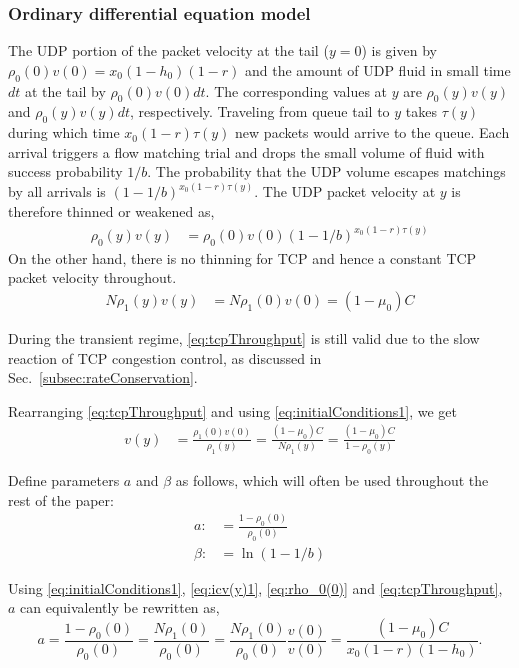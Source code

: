 \documentclass{IEEEtran}
\begin{document}
       \subsubsection{Ordinary differential equation model}\label{subsec:ode}
The UDP portion of the packet velocity at the tail ($y=0$) is given by $\rho_0(0)v(0)=x_0(1-h_0)(1-r)$ and the amount of UDP fluid in small time $dt$ at the tail by $\rho_0(0)v(0)dt$. The corresponding values at $y$ are $\rho_0(y)v(y)$ and $\rho_0(y)v(y)dt$, respectively. Traveling from queue tail to $y$ takes $\tau(y)$ during which time $x_0(1-r)\tau(y)$ new packets would arrive to the queue. Each arrival triggers a flow matching trial and drops the small volume of fluid with success probability $1/b$. The probability that the UDP volume escapes matchings by all arrivals  is $(1-1/b)^{x_0(1-r)\tau(y)}$. The UDP packet velocity at $y$ is therefore thinned or weakened as,
    \begin{align}
        \rho_0(y)v(y)&=\rho_0(0)v(0)(1-1/b)^{x_0(1-r)\tau(y)} \label{eq:chokeSteadyThinning}
    \end{align}
    On the other hand, there is no thinning for TCP and hence a constant  TCP packet velocity throughout. \begin{align}
            N\rho_1(y)v(y)&= N\rho_1(0)v(0)=(1-\mu_0)C     \label{eq:tcpThroughput}
    \end{align}

    During the transient regime, \eqref{eq:tcpThroughput} is still valid due to the slow reaction of TCP congestion control, as discussed in Sec.~\ref{subsec:rateConservation}.

    Rearranging \eqref{eq:tcpThroughput} and using \eqref{eq:initialConditions1}, we get
    \begin{align}
            v(y)&= \frac{\rho_1(0)v(0)}{\rho_1(y)}=\frac{(1-\mu_0)C}{N \rho_1(y)} = \frac{(1-\mu_0)C}{1-\rho_0(y)}    \label{eq:v(y)}
    \end{align}


Define parameters $a$ and $\beta$ as follows, which will often be used throughout the rest of the paper:
    \begin{align}
      a: &=\frac{1-\rho_0(0)}{\rho_0(0)} \nonumber \\
      \beta: &=\ln(1-1/b) \nonumber
    \end{align}

    Using \eqref{eq:initialConditions1}, \eqref{eq:icv(y)1}, \eqref{eq:rho_0(0)} and \eqref{eq:tcpThroughput}, $a$ can equivalently be rewritten as,
\begin{equation}\nonumber
        a=\frac{1-\rho_0(0)}{\rho_0(0)} = \frac{N\rho_1(0)}{\rho_0(0)}=\frac{N\rho_1(0)}{\rho_0(0)}\frac{v(0)}{v(0)}=\frac{(1-\mu_0)C}{x_0(1-r)(1-h_0)}.
    \end{equation}
\end{document}
